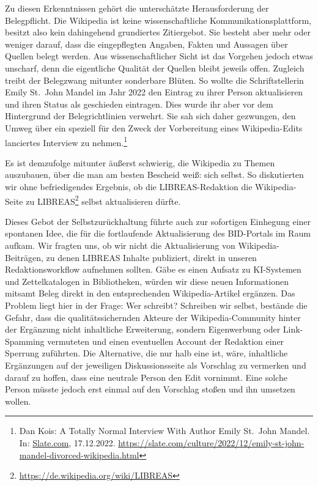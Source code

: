 \documentclass[a4paper,
fontsize=11pt,
oneside,
numbers=noperiodatend,
parskip=half-,
bibliography=totoc,
final
]{scrartcl}
\begin{document}
Zu diesen Erkenntnissen gehört die unterschätzte Herausforderung der
Belegpflicht. Die Wikipedia ist keine wissenschaftliche
Kommunikationsplattform, besitzt also kein dahingehend grundiertes
Zitiergebot. Sie besteht aber mehr oder weniger darauf, dass die
eingepflegten Angaben, Fakten und Aussagen über Quellen belegt werden.
Aus wissenschaftlicher Sicht ist das Vorgehen jedoch etwas unscharf,
denn die eigentliche Qualität der Quellen bleibt jeweils offen. Zugleich
treibt der Belegzwang mitunter sonderbare Blüten. So wollte die
Schriftstellerin Emily St.~John Mandel im Jahr 2022 den Eintrag zu ihrer
Person aktualisieren und ihren Status als geschieden eintragen. Dies
wurde ihr aber vor dem Hintergrund der Belegrichtlinien verwehrt. Sie
sah sich daher gezwungen, den Umweg über ein speziell für den Zweck der
Vorbereitung eines Wikipedia-Edits lanciertes Interview zu
nehmen.\footnote{Dan Kois: A Totally Normal Interview With Author Emily
  St.~John Mandel. In: \href{http://slate.com}{Slate.com}, 17.12.2022.
  \url{https://slate.com/culture/2022/12/emily-st-john-mandel-divorced-wikipedia.html}}

Es ist demzufolge mitunter äußerst schwierig, die Wikipedia zu Themen
auszubauen, über die man am besten Bescheid weiß: sich selbst. So
diskutierten wir ohne befriedigendes Ergebnis, ob die LIBREAS-Redaktion
die Wikipedia-Seite zu LIBREAS\footnote{\url{https://de.wikipedia.org/wiki/LIBREAS}}
selbst aktualisieren dürfte.

Dieses Gebot der Selbstzurückhaltung führte auch zur sofortigen
Einhegung einer spontanen Idee, die für die fortlaufende Aktualisierung
des BID-Portals im Raum aufkam. Wir fragten uns, ob wir nicht die
Aktualisierung von Wikipedia-Beiträgen, zu denen LIBREAS Inhalte
publiziert, direkt in unseren Redaktionsworkflow aufnehmen sollten. Gäbe
es einen Aufsatz zu KI-Systemen und Zettelkatalogen in Bibliotheken,
würden wir diese neuen Informationen mitsamt Beleg direkt in den
entsprechenden Wikipedia-Artikel ergänzen. Das Problem liegt hier in der
Frage: Wer schreibt? Schreiben wir selbst, bestände die Gefahr, dass die
qualitätssichernden Akteure der Wikipedia-Community hinter der Ergänzung
nicht inhaltliche Erweiterung, sondern Eigenwerbung oder Link-Spamming
vermuteten und einen eventuellen Account der Redaktion einer Sperrung
zuführten. Die Alternative, die nur halb eine ist, wäre, inhaltliche
Ergänzungen auf der jeweiligen Diskussionsseite als Vorschlag zu
vermerken und darauf zu hoffen, dass eine neutrale Person den Edit
vornimmt. Eine solche Person müsste jedoch erst einmal auf den Vorschlag
stoßen und ihn umsetzen wollen.
\end{document}
